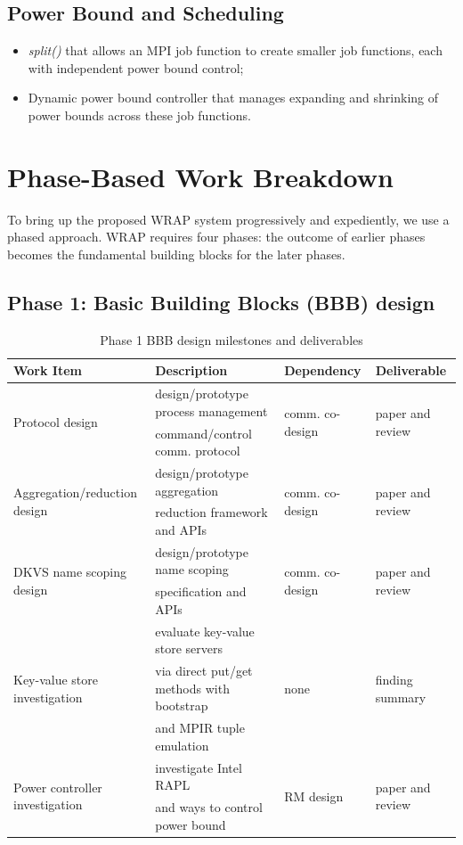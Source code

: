 \documentclass[10pt]{article}
\begin{document}
\subsection{Power Bound and Scheduling}
\begin{itemize}
\item{{\em split()} that allows an MPI job function to create smaller job functions, each with independent power bound control;}
\item{Dynamic power bound controller that manages expanding and shrinking of power bounds across these job functions.}
\end{itemize}

\section{Phase-Based Work Breakdown}
To bring up the proposed WRAP system progressively and expediently, we use a phased approach. 
WRAP requires four phases: the outcome of earlier phases becomes the fundamental 
building blocks for the later phases. 
 
\subsection{Phase 1: Basic Building Blocks (BBB) design} 

\begin{table}
\centering
\begin{tabular}{|l|l|l|l|}
\hline
Work Item & Description & Dependency & Deliverable \\
\hline
\multirow{2}{*}{Protocol design} & design/prototype process management & \multirow{2}{*}{comm. co-design} & \multirow{2}{*}{paper and review} \\
& command/control comm. protocol & & \\ \hline
\multirow{2}{*}{Aggregation/reduction design} & design/prototype aggregation &  \multirow{2}{*}{comm. co-design} & \multirow{2}{*}{paper and review} \\
& reduction framework and APIs & & \\ \hline
\multirow{2}{*}{DKVS name scoping design} & design/prototype name scoping & \multirow{2}{*}{comm. co-design} & \multirow{2}{*}{paper and review} \\
& specification and APIs & & \\ \hline
\multirow{3}{*}{Key-value store investigation}& evaluate key-value store servers & \multirow{3}{*}{none} & \multirow{3}{*}{finding summary} \\
& via direct put/get methods with bootstrap & & \\
& and MPIR tuple emulation& & \\ \hline 
\multirow{2}{*}{Power controller investigation} & investigate Intel RAPL &  \multirow{2}{*}{RM design} & \multirow{2}{*}{paper and review} \\
& and ways to control power bound & & \\ \hline
\end{tabular}
\caption{Phase 1 BBB design milestones and deliverables}
\label{tab:phase1}
\end{table}
\end{document}

